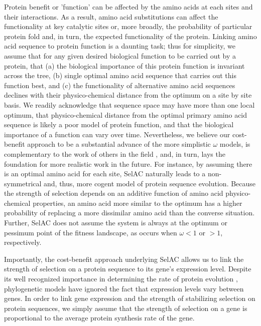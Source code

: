 \documentclass[12pt,letterpaper]{article}
\newcommand{\PC}{physico-chemical\xspace}
\newcommand{\selac}{SelAC\xspace}
\begin{document}
Protein benefit or 'function' can be affected by the amino acids at each sites and their interactions.
As a result, amino acid substitutions can affect the functionality at key catalytic sites or, more broadly, the probability of particular protein fold and, in turn, the expected functionality of the protein.
Linking amino acid sequence to protein function is a daunting task; thus for simplicity, we assume that for any given desired biological function to be carried out by a protein, that (a) the biological importance of this protein function is invariant across the tree, (b) single optimal amino acid sequence that carries out this function best, and (c) the functionality of alternative amino acid sequences declines with their \PC distance from the optimum on a site by site basis.
We readily acknowledge that sequence space may have more than one local optimum, that \PC distance from the optimal primary amino acid sequence is likely a poor model of protein function, and that the biological importance of a function can vary over time.
Nevertheless, we believe our cost-benefit approach to be a substantial advance of the more simplistic $\omega$ models, is complementary to the work of others in the field \citep[e.g.][]{ThorneEtAl2012,RodrigueAndLartillot2014}, and, in turn, lays the foundation for more realistic work in the future.
For instance, by assuming there is an optimal amino acid for each site, \selac naturally leads to a non-symmetrical and, thus, more cogent model of protein sequence evolution.
Because the strength of selection depends on an additive function of amino acid \PC properties, an amino acid more similar to the optimum has a higher probability of replacing a more dissimilar amino acid than the converse situation.
Further, \selac does not assume the system is always at the optimum or pessimum point of the fitness landscape, as occurs when $\omega < 1$ or $>1$, respectively.

Importantly, the cost-benefit approach underlying \selac allows us to link the strength of selection on a protein sequence to its gene's expression level.
Despite its well recognized importance in determining the rate of protein evolution \citep[e.g.][]{DrummondEtAl2005,DrummondEtAl2006a}, phylogenetic models have ignored the fact that expression levels vary between genes.
In order to link gene expression and the strength of stabilizing selection on protein sequences, we simply assume that the strength of selection on a gene is proportional to the average protein synthesis rate of the gene.
\end{document}
